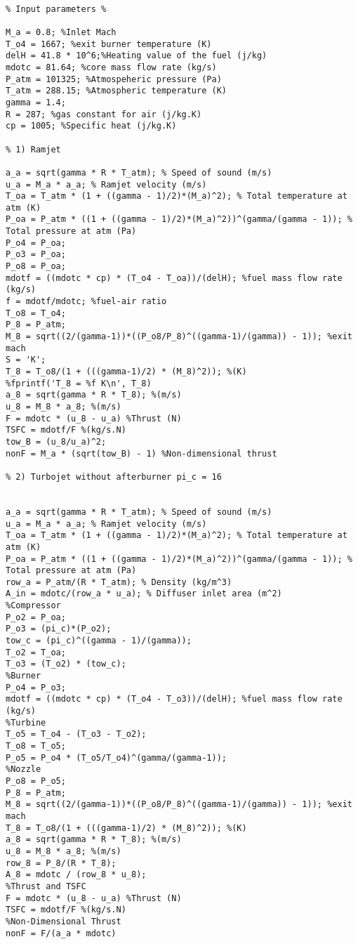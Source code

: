 \documentclass[]{article}
\theoremstyle{definition}
\begin{document}
\begin{lstlisting}[style=Matlab-editor]
%Problem 1

% Input parameters %

M_a = 0.8; %Inlet Mach
T_o4 = 1667; %exit burner temperature (K)
delH = 41.8 * 10^6;%Heating value of the fuel (j/kg)
mdotc = 81.64; %core mass flow rate (kg/s)
P_atm = 101325; %Atmospeheric pressure (Pa)
T_atm = 288.15; %Atmospheric temperature (K)
gamma = 1.4;
R = 287; %gas constant for air (j/kg.K)
cp = 1005; %Specific heat (j/kg.K)

% 1) Ramjet

a_a = sqrt(gamma * R * T_atm); % Speed of sound (m/s)
u_a = M_a * a_a; % Ramjet velocity (m/s)
T_oa = T_atm * (1 + ((gamma - 1)/2)*(M_a)^2); % Total temperature at atm (K)
P_oa = P_atm * ((1 + ((gamma - 1)/2)*(M_a)^2))^(gamma/(gamma - 1)); % Total pressure at atm (Pa)
P_o4 = P_oa;
P_o3 = P_oa;
P_o8 = P_oa;
mdotf = ((mdotc * cp) * (T_o4 - T_oa))/(delH); %fuel mass flow rate (kg/s)
f = mdotf/mdotc; %fuel-air ratio
T_o8 = T_o4;
P_8 = P_atm;
M_8 = sqrt((2/(gamma-1))*((P_o8/P_8)^((gamma-1)/(gamma)) - 1)); %exit mach
S = 'K';
T_8 = T_o8/(1 + (((gamma-1)/2) * (M_8)^2)); %(K)
%fprintf('T_8 = %f K\n', T_8)
a_8 = sqrt(gamma * R * T_8); %(m/s)
u_8 = M_8 * a_8; %(m/s)
F = mdotc * (u_8 - u_a) %Thrust (N)
TSFC = mdotf/F %(kg/s.N)
tow_B = (u_8/u_a)^2;
nonF = M_a * (sqrt(tow_B) - 1) %Non-dimensional thrust

% 2) Turbojet without afterburner pi_c = 16


a_a = sqrt(gamma * R * T_atm); % Speed of sound (m/s)
u_a = M_a * a_a; % Ramjet velocity (m/s)
T_oa = T_atm * (1 + ((gamma - 1)/2)*(M_a)^2); % Total temperature at atm (K)
P_oa = P_atm * ((1 + ((gamma - 1)/2)*(M_a)^2))^(gamma/(gamma - 1)); % Total pressure at atm (Pa)
row_a = P_atm/(R * T_atm); % Density (kg/m^3)
A_in = mdotc/(row_a * u_a); % Diffuser inlet area (m^2)
%Compressor
P_o2 = P_oa;
P_o3 = (pi_c)*(P_o2);
tow_c = (pi_c)^((gamma - 1)/(gamma));
T_o2 = T_oa;
T_o3 = (T_o2) * (tow_c);
%Burner
P_o4 = P_o3;
mdotf = ((mdotc * cp) * (T_o4 - T_o3))/(delH); %fuel mass flow rate (kg/s)
%Turbine
T_o5 = T_o4 - (T_o3 - T_o2);
T_o8 = T_o5;
P_o5 = P_o4 * (T_o5/T_o4)^(gamma/(gamma-1));
%Nozzle
P_o8 = P_o5;
P_8 = P_atm;
M_8 = sqrt((2/(gamma-1))*((P_o8/P_8)^((gamma-1)/(gamma)) - 1)); %exit mach
T_8 = T_o8/(1 + (((gamma-1)/2) * (M_8)^2)); %(K)
a_8 = sqrt(gamma * R * T_8); %(m/s)
u_8 = M_8 * a_8; %(m/s)
row_8 = P_8/(R * T_8);
A_8 = mdotc / (row_8 * u_8);
%Thrust and TSFC
F = mdotc * (u_8 - u_a) %Thrust (N)
TSFC = mdotf/F %(kg/s.N)
%Non-Dimensional Thrust
nonF = F/(a_a * mdotc)


\end{lstlisting}
\end{document}
